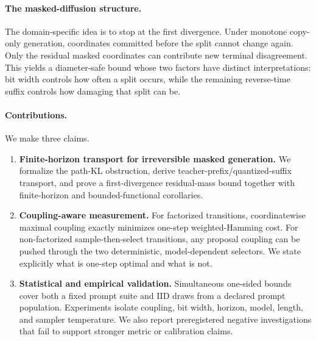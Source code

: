 \paragraph{The masked-diffusion structure.}
The domain-specific idea is to stop at the first divergence. Under monotone copy-only generation, coordinates committed before the split cannot change again. Only the residual masked coordinates can contribute new terminal disagreement. This yields a diameter-safe bound whose two factors have distinct interpretations: bit width controls how often a split occurs, while the remaining reverse-time suffix controls how damaging that split can be.

\paragraph{Contributions.}
We make three claims.
\begin{enumerate}[leftmargin=1.6em,itemsep=2pt,topsep=2pt]
\item \textbf{Finite-horizon transport for irreversible masked generation.} We formalize the path-KL obstruction, derive teacher-prefix/quantized-suffix transport, and prove a first-divergence residual-mass bound together with finite-horizon and bounded-functional corollaries.
\item \textbf{Coupling-aware measurement.} For factorized transitions, coordinatewise maximal coupling exactly minimizes one-step weighted-Hamming cost. For non-factorized sample-then-select transitions, any proposal coupling can be pushed through the two deterministic, model-dependent selectors. We state explicitly what is one-step optimal and what is not.
\item \textbf{Statistical and empirical validation.} Simultaneous one-sided bounds cover both a fixed prompt suite and IID draws from a declared prompt population. Experiments isolate coupling, bit width, horizon, model, length, and sampler temperature. We also report preregistered negative investigations that fail to support stronger metric or calibration claims.
\end{enumerate}


